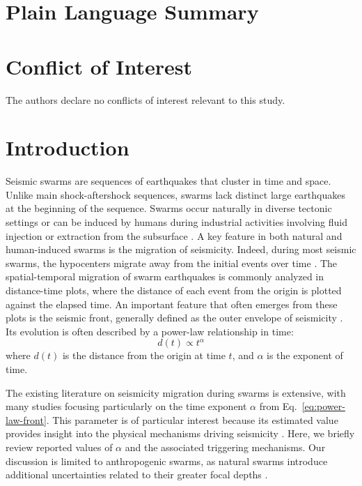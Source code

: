 \documentclass[draft]{agujournal2019}
\begin{document}
\section*{Plain Language Summary}

\section*{Conflict of Interest}
The authors declare no conflicts of interest relevant to this study.

%
%

\section{Introduction}

Seismic swarms are sequences of earthquakes that cluster in time and space. Unlike main shock-aftershock sequences, swarms lack distinct large earthquakes at the beginning of the sequence. Swarms occur naturally in diverse tectonic settings or can be induced by humans during industrial activities involving fluid injection or extraction from the subsurface \cite{ChenEtAl2012, DanreEtAl2024a}. A key feature in both natural and human-induced swarms is the migration of seismicity. Indeed, during most seismic swarms, the hypocenters migrate away from the initial events over time \cite{ShapiroEtAl2002, ChenEtAl2012, DeBarrosEtAl2021, DanreEtAl2024}. The spatial-temporal migration of swarm earthquakes is commonly analyzed in distance-time plots, where the distance of each event from the origin is plotted against the elapsed time. An important feature that often emerges from these plots is the seismic front, generally defined as the outer envelope of seismicity \cite{GoebelBrodsky2018, DanreEtAl2024}. Its evolution is often described by a power-law relationship in time:
\begin{equation}\label{eq:power-law-front}
	d(t) \propto t^{\alpha}
\end{equation}
where $d(t)$ is the distance from the origin at time $t$, and $\alpha$ is the exponent of time.

The existing literature on seismicity migration during swarms is extensive, with many studies focusing particularly on the time exponent $\alpha$ from Eq.~\ref{eq:power-law-front}. This parameter is of particular interest because its estimated value provides insight into the physical mechanisms driving seismicity \cite{ShapiroEtAl1997, ChenEtAl2012, GoebelBrodsky2018, DeBarrosEtAl2021, DanreEtAl2024}. Here, we briefly review reported values of $\alpha$ and the associated triggering mechanisms. Our discussion is limited to anthropogenic swarms, as natural swarms introduce additional uncertainties related to their greater focal depths .
\end{document}
